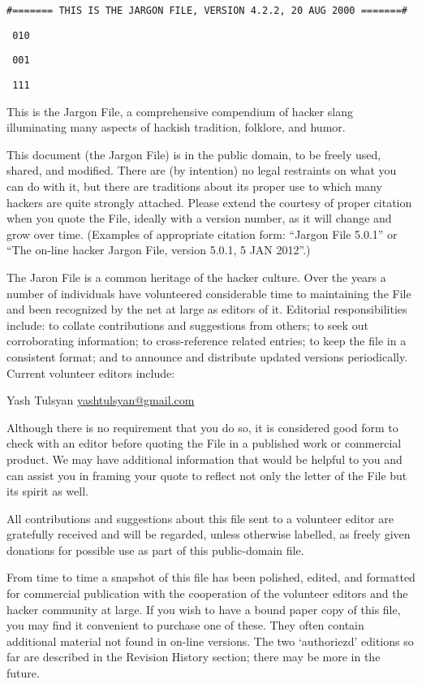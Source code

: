 \texttt{\#======= THIS IS THE JARGON FILE, VERSION 4.2.2, 20 AUG 2000 =======\#}

\texttt{\ 010}

\texttt{\ 001}

\texttt{\ 111}
\setlength{\parskip}{6pt}

This is the Jargon File, a comprehensive compendium of hacker slang illuminating many aspects of hackish tradition, folklore, and humor.

This document (the Jargon File) is in the public domain, to be freely used, shared, and modified. There are (by intention) no legal
restraints on what you can do with it, but there are traditions about its proper use to which many hackers are quite strongly attached.
Please extend the courtesy of proper citation when you quote the File, ideally with a version number, as it will change and grow over time.
(Examples of appropriate citation form: ``Jargon File 5.0.1'' or ``The on-line hacker Jargon File, version 5.0.1, 5 JAN 2012''.)

The Jaron File is a common heritage of the hacker culture. Over the years a number of individuals have volunteered considerable time to
maintaining the File and been recognized by the net at large as editors of it. Editorial responsibilities include: to collate contributions
and suggestions from others; to seek out corroborating information; to cross-reference related entries; to keep the file in a consistent
format; and to announce and distribute updated versions periodically. Current volunteer editors include:

Yash Tulsyan \url{yashtulsyan@gmail.com}

Although there is no requirement that you do so, it is considered good form to check with an editor before quoting the File in a published
work or commercial product. We may have additional information that would be helpful to you and can assist you in framing your quote to
reflect not only the letter of the File but its spirit as well.

All contributions and suggestions about this file sent to a volunteer editor are gratefully received and will be regarded, unless otherwise
labelled, as freely given donations for possible use as part of this public-domain file.

From time to time a snapshot of this file has been polished, edited, and formatted for commercial publication with the cooperation of the
volunteer editors and the hacker community at large. If you wish to have a bound paper copy of this file, you may find it convenient to
purchase one of these. They often contain additional material not found in on-line versions. The two `authoriezd' editions so far are
described in the Revision History section; there may be more in the future.

